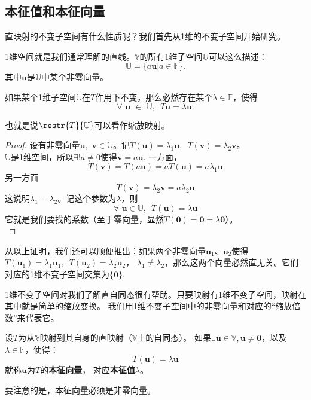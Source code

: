 \documentclass[12pt,UTF8]{ctexbook}
\begin{document}
\subsection{本征值和本征向量}
直映射的不变子空间有什么性质呢？我们首先从1维的不变子空间开始研究。

1维空间就是我们通常理解的直线。$\mathbb{V}$的所有1维子空间$\mathbb{U}$可以这么描述：
$$\mathbb{U} = \{a\mathbf{u} | a \in \mathbb{F}\}.$$
其中$\mathbf{u}$是$\mathbb{U}$中某个非零向量。

\begin{pp}\label{pp:6_1}
    如果某个1维子空间$\mathbb{U}$在$T$作用下不变，那么必然存在某个$\lambda \in \mathbb{F}$，使得
    $$ \forall \,\, \mathbf{u} \,\, \in \,\,\mathbb{U} ,\,\,\, T\mathbf{u} = \lambda\mathbf{u}.$$
\end{pp}
也就是说$\restr{T}{\mathbb{U}}$可以看作缩放映射。
\begin{proof} %
    设有非零向量$\mathbf{u}, \,\, \mathbf{v} \in \mathbb{U}$。记$T(\mathbf{u}) = \lambda_1 \mathbf{u} , \,\,\, T(\mathbf{v}) = \lambda_2 \mathbf{v}$。\\
    $\mathbb{U}$是1维空间，所以$\exists ! a \neq 0$使得$\mathbf{v} = a\mathbf{u}$. 一方面，
    $$ T(\mathbf{v}) = T(a\mathbf{u}) = a T(\mathbf{u}) = a\lambda_1 \mathbf{u}$$
    另一方面
    $$ T(\mathbf{v}) = \lambda_2 \mathbf{v} = a\lambda_2 \mathbf{u}$$
    这说明$\lambda_1 = \lambda_2$。记这个参数为$\lambda$，则
    $$\forall \,\, \mathbf{u} \in \mathbb{U}, \,\,\,T(\mathbf{u}) = \lambda\mathbf{u}$$
    它就是我们要找的系数（至于零向量，显然$T(\mathbf{0}) = \mathbf{0} = \lambda \mathbf{0}$）。\\
\end{proof}

从以上证明，我们还可以顺便推出：如果两个非零向量$\mathbf{u}_1$、$\mathbf{u}_2$使得$T(\mathbf{u}_1) = \lambda_1\mathbf{u}_1, \,\,\, T(\mathbf{u}_2) = \lambda_2\mathbf{u}_2$，
$\lambda_1 \neq \lambda_2$，那么这两个向量必然直无关。它们对应的1维不变子空间交集为$\{\mathbf{0}\}$.

1维不变子空间对我们了解直自同态很有帮助。只要映射有1维不变子空间，映射在其中就是简单的缩放变换。
我们用1维不变子空间中的非零向量和对应的“缩放倍数”来代表它。

\begin{df}\label{df:6_2}
    设$T$为从$\mathbb{V}$映射到其自身的直映射（$\mathbb{V}$上的自同态）。
    如果$\exists \mathbf{u} \in \mathbb{V}, \mathbf{u} \neq \mathbf{0}$，以及$\lambda \in \mathbb{F}$，使得： 
    $$ T(\mathbf{u}) = \lambda \mathbf{u} $$
    就称$\mathbf{u}$为$T$的\textbf{本征向量}，
    对应\textbf{本征值}$\lambda$。
\end{df}
要注意的是，本征向量必须是非零向量。
\end{document}
